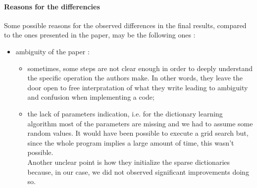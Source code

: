 \paragraph{Reasons for the differencies}
Some possible reasons for the observed differences in the final results, compared to the ones presented in the paper, may be the following ones :
\begin{itemize}
    \item ambiguity of the paper :
    \begin{itemize}
        \item sometimes, some steps are not clear enough in order to deeply understand the specific operation the authors make. In other words, they leave the door open to free interpratation of what they write leading to ambiguity and confusion when implementing a code;
        \item the lack of parameters indication, i.e. for the dictionary learning algorithm most of the parameters are missing and we had to assume some random values. It would have been possible to execute a grid search but, since the whole program implies a large amount of time, this wasn't possible. \\
              Another unclear point is how they initialize the sparse dictionaries because, in our case, we did not observed significant improvements doing so.
    \end{itemize}
\end{itemize}